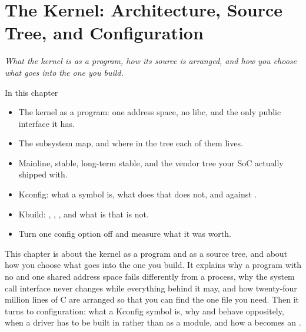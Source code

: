 
\chapter{The Kernel: Architecture, Source Tree, and Configuration}
\label{c3:ch}

{\large\itshape What the kernel is as a program, how its source is arranged, and how you choose what
goes into the one you build.\par}

\begin{chapterbox}{In this chapter}
\begin{itemize}
  \item The kernel as a program: one address space, no libc, and the only public interface it has.
  \item The subsystem map, and where in the tree each of them lives.
  \item Mainline, stable, long-term stable, and the vendor tree your SoC actually shipped with.
  \item Kconfig: what a symbol is, what  does that  does not, and
     against .
  \item Kbuild: , , , and what  is that
     is not.
  \item Turn one config option off and measure what it was worth.
\end{itemize}
\end{chapterbox}

This chapter is about the kernel as a program and as a source tree, and about how you choose what
goes into the one you build. It explains why a program with no  and one shared address
space fails differently from a process, why the system call interface never changes while
everything behind it may, and how twenty-four million lines of C are arranged so that you can find
the one file you need. Then it turns to configuration: what a Kconfig symbol is, why 
and  behave oppositely, when a driver has to be built in rather than as a module,
and how a  becomes an .

